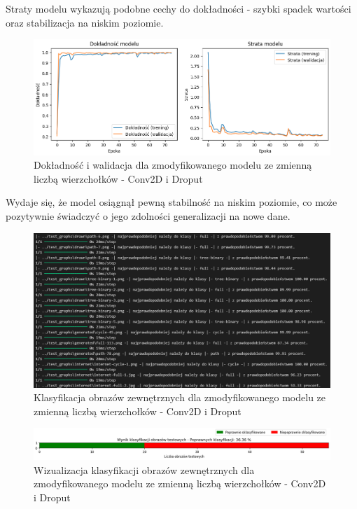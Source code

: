 Straty modelu wykazują podobne cechy do dokładności - szybki spadek wartości oraz stabilizacja na niskim poziomie.

\begin{figure}[ht]
	\centering
	\includegraphics[width=14cm]{resources/tests/images/v4/multiple_edges_1_img.png}
	\caption{Dokładność i walidacja dla zmodyfikowanego modelu ze zmienną liczbą wierzchołków - Conv2D i Droput}
	\label{Fig:tests-var-1a}
\end{figure}
\FloatBarrier

Wydaje się, że model osiągnął pewną stabilność na niskim poziomie, co może pozytywnie świadczyć o jego zdolności generalizacji na nowe dane.

\begin{figure}[ht]
	\centering
	\includegraphics[width=14cm]{resources/tests/images/v4/multiple_edges_1_txt.png}
	\caption{Klasyfikacja obrazów zewnętrznych dla zmodyfikowanego modelu ze zmienną liczbą wierzchołków - Conv2D i Droput}
	\label{Fig:tests-var-1b}
\end{figure}
\FloatBarrier

\begin{figure}[ht]
	\centering
	\includegraphics[width=14cm]{resources/tests/images/v4/multiple_edges_1_bar.png}
	\caption{Wizualizacja klasyfikacji obrazów zewnętrznych dla zmodyfikowanego modelu ze zmienną liczbą wierzchołków - Conv2D i Droput}
	\label{Fig:tests-var-1c}
\end{figure}
\FloatBarrier

